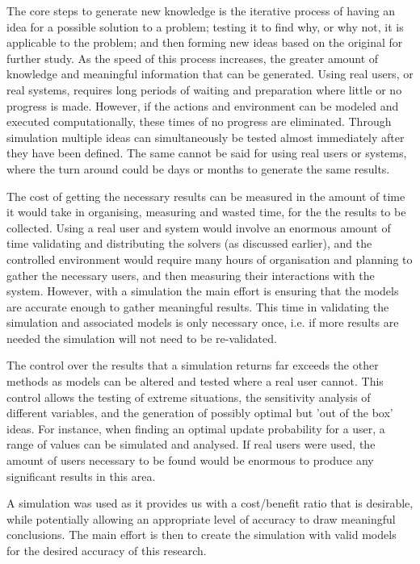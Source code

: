 The core steps to generate new knowledge is the iterative process of having an idea for a possible solution to a problem; 
testing it to find why, or why not, it is applicable to the problem;
and then forming new ideas based on the original for further study.
As the speed of this process increases, the greater amount of knowledge and meaningful information that can be generated. 
Using real users, or real systems, requires long periods of waiting and preparation where little or no progress is made.
However, if the actions and environment can be modeled and executed computationally, these times of no progress are eliminated.
Through simulation multiple ideas can simultaneously be tested almost immediately after they have been defined.
The same cannot be said for using real users or systems, where the turn around could be days or months to generate the same results.  

The cost of getting the necessary results can be measured in the amount of time it would take in organising, measuring and wasted time, for the the results to be collected.
Using a real user and system would involve an enormous amount of time validating and distributing the solvers (as discussed earlier), 
and the controlled environment would require many hours of organisation and planning to gather the necessary users, and then measuring their interactions with the system.
However, with a simulation the main effort is ensuring that the models are accurate enough to gather meaningful results.
This time in validating the simulation and associated models is only necessary once, 
i.e. if more results are needed the simulation will not need to be re-validated.

The control over the results that a simulation returns far exceeds the other methods as models can be altered and tested where a real user cannot. 
This control allows the testing of extreme situations, the sensitivity analysis of different variables,
and the generation of possibly optimal but 'out of the box' ideas. 
For instance, when finding an optimal update probability for a user, a range of values can be simulated and analysed.
If real users were used, the amount of users necessary to be found would be enormous to produce any significant results in this area.

A simulation was used as it provides us with a cost/benefit ratio that is desirable, while potentially allowing an appropriate level of accuracy to draw meaningful conclusions.
The main effort is then to create the simulation with valid models for the desired accuracy of this research.

